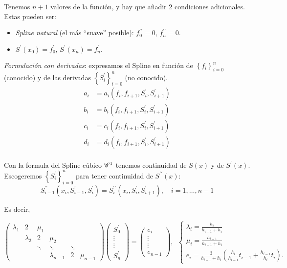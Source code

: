 Tenemos $n+1$ valores de la función, y hay que añadir $2$ condiciones adicionales. Estas pueden ser:

\begin{itemize}
    \item \emph{Spline natural} (el más ``suave'' posible): $f^{\prime\prime}_0 = 0$, $f^{\prime\prime}_n = 0$.
    \item $S^{\prime}\left( x_0 \right) = f^{\prime}_0$, $S^{\prime}\left( x_n \right) = f^{\prime}_n$.
\end{itemize}

\emph{Formulación con derivadas}: expresamos el Spline en función de $\left\{ f_i \right\}_{i=0}^n$ (conocido) y de las derivadas $\left\{ S^{\prime}_i \right\}_{i=0}^n$ (no conocido).
\begin{align*}
    a_i &= a_i\left( f_i, f_{i+1}, S^{\prime}_i,S^{\prime}_{i+1} \right) \\
    b_i &= b_i\left( f_i, f_{i+1}, S^{\prime}_i,S^{\prime}_{i+1} \right) \\
    c_i &= c_i\left( f_i, f_{i+1}, S^{\prime}_i,S^{\prime}_{i+1} \right) \\
    d_i &= d_i\left( f_i, f_{i+1}, S^{\prime}_i,S^{\prime}_{i+1} \right) \\
\end{align*}

Con la formula del Spline cúbico $\mathscr{C}^1$ tenemos continuidad de $S(x)$ y de $S^{\prime}(x)$. Escogeremos $\left\{ S^{\prime}_i \right\}_{i=0}^n$ para tener continuidad de $S^{\prime\prime}(x)$:
\[
    S^{\prime\prime}_{i-1}\left( x_i, S^{\prime}_{i-1}, S^{\prime}_i \right) = S^{\prime\prime}_i\left( x_i, S^{\prime}_i, S^{\prime}_{i+1} \right),\quad i = 1, \dots, n-1
\]

Es decir,

\[
\begin{pmatrix}
    \lambda_1   & 2 & \mu_1 & \\
    & \lambda_2 & 2 & \mu_2 & & \\
    & & \ddots    & \ddots & \ddots & \\
    & & & \lambda_{n-1} & 2 & \mu_{n-1} 
\end{pmatrix}
\begin{pmatrix}
    S^{\prime}_0 \\
    \vdots \\
    \vdots \\
    S^{\prime}_n
\end{pmatrix}
=
\begin{pmatrix}
    e_i \\
    \vdots \\
    \vdots \\
    e_{n-1}
\end{pmatrix}
,\,\,\,
\begin{cases}
    \lambda_i = \frac{h_i}{h_{i-1} + h_i} \\
    \mu_i = \frac{h_{i-1}}{h_{i-1}+h_i} \\
    e_i = \frac{3}{h_{i-1} + h_i}\left( \frac{h_i}{h_{i-1}}t_{i-1} + \frac{h_{i-1}}{h_i}t_i \right).
\end{cases}
\]

